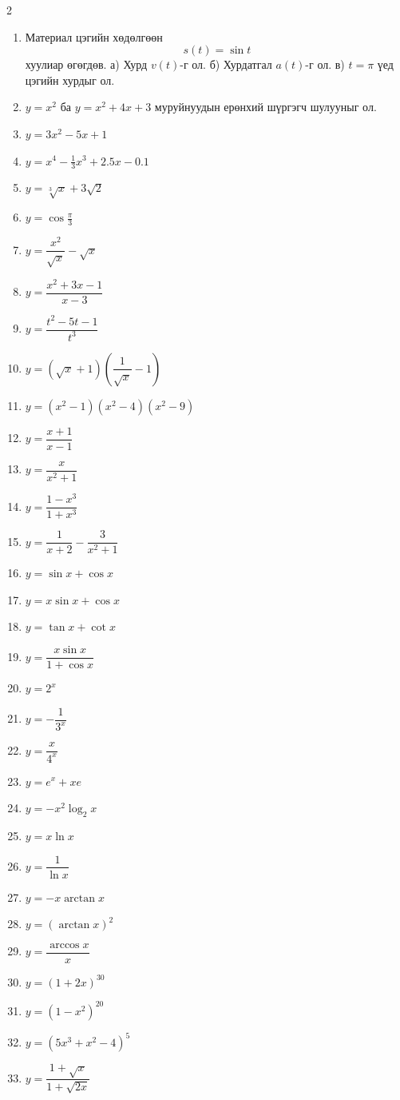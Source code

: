 \begin{multicols}{2}
\begin{enumerate}
 \item Материал цэгийн хөдөлгөөн
\[
s(t)=\sin t
\]
хуулиар өгөгдөв.  
а) Хурд $v(t)$-г ол.  
б) Хурдатгал $a(t)$-г ол.  
в) $t=\pi$ үед цэгийн хурдыг ол.
\item $y=x^2$ ба $y=x^2+4x+3$ муруйнуудын ерөнхий шүргэгч шулууныг ол.
  \item $y = 3x^2 - 5x + 1$
  \item $y = x^4 - \tfrac{1}{3}x^3 + 2.5x - 0.1$
  \item $y = \sqrt[3]{x} + 3\sqrt{2}$
  \item $y = \cos \tfrac{\pi}{3}$
  \item $y = \dfrac{x^2}{\sqrt{x}} - \sqrt{x}$
  \item $y = \dfrac{x^2 + 3x - 1}{x - 3}$
  \item $y = \dfrac{t^2 - 5t - 1}{t^3}$
  \item $y = (\sqrt{x} + 1)\left(\dfrac{1}{\sqrt{x}} - 1\right)$
  \item $y = (x^2 - 1)(x^2 - 4)(x^2 - 9)$
  \item $y = \dfrac{x + 1}{x - 1}$
  \item $y = \dfrac{x}{x^2 + 1}$
  \item $y = \dfrac{1 - x^3}{1 + x^3}$
  \item $y = \dfrac{1}{x + 2} - \dfrac{3}{x^2 + 1}$
  \item $y = \sin x + \cos x$
  \item $y = x \sin x + \cos x$
  \item $y = \tan x + \cot x$
  \item $y = \dfrac{x \sin x}{1 + \cos x}$
  \item $y = 2^x$
  \item $y = -\dfrac{1}{3^x}$
  \item $y = \dfrac{x}{4^x}$
  \item $y = e^x + x e$
  \item $y = -x^2 \log_2 x$
  \item $y = x \ln x$
  \item $y = \dfrac{1}{\ln x}$
  \item $y = -x \arctan x$
  \item $y = (\arctan x)^2$
  \item $y = \dfrac{\arccos x}{x}$
  \item $y = (1 + 2x)^{30}$
  \item $y = (1 - x^2)^{20}$
  \item $y = (5x^3 + x^2 - 4)^5$
  \item $y = \dfrac{1 + \sqrt{x}}{1 + \sqrt{2x}}$

\end{enumerate}
\end{multicols}
